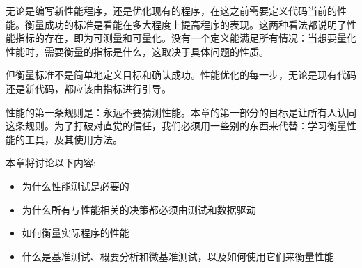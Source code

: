 无论是编写新性能程序，还是优化现有的程序，在这之前需要定义代码当前的性能。衡量成功的标准是看能在多大程度上提高程序的表现。这两种看法都说明了性能指标的存在，即为可测量和可量化。没有一个定义能满足所有情况：当想要量化性能时，需要衡量的指标是什么，这取决于具体问题的性质。

但衡量标准不是简单地定义目标和确认成功。性能优化的每一步，无论是现有代码还是新代码，都应该由指标进行引导。

性能的第一条规则是：永远不要猜测性能。本章的第一部分的目标是让所有人认同这条规则。为了打破对直觉的信任，我们必须用一些别的东西来代替：学习衡量性能的工具，及其使用方法。

本章将讨论以下内容:

\begin{itemize}
\item 为什么性能测试是必要的
\item 为什么所有与性能相关的决策都必须由测试和数据驱动
\item 如何衡量实际程序的性能
\item 什么是基准测试、概要分析和微基准测试，以及如何使用它们来衡量性能
\end{itemize}

